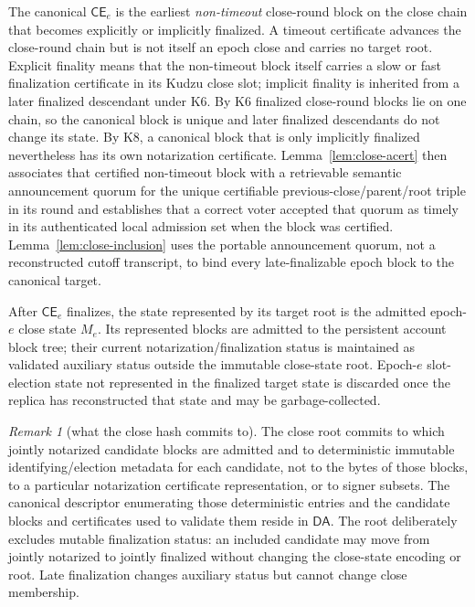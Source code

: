 \documentclass[11pt]{article}
\theoremstyle{definition}
\theoremstyle{remark}
\newtheorem{remark}[theorem]{Remark}
\newcommand{\CE}{\mathsf{CE}}
\newcommand{\DA}{\mathsf{DA}}
\begin{document}
The canonical $\CE_e$ is the earliest \emph{non-timeout} close-round block on the close chain that becomes explicitly or implicitly finalized. A timeout certificate advances the close-round chain but is not itself an epoch close and carries no target root. Explicit finality means that the non-timeout block itself carries a slow or fast finalization certificate in its Kudzu close slot; implicit finality is inherited from a later finalized descendant under K6. By K6 finalized close-round blocks lie on one chain, so the canonical block is unique and later finalized descendants do not change its state. By K8, a canonical block that is only implicitly finalized nevertheless has its own notarization certificate. Lemma~\ref{lem:close-acert} then associates that certified non-timeout block with a retrievable semantic announcement quorum for the unique certifiable previous-close/parent/root triple in its round and establishes that a correct voter accepted that quorum as timely in its authenticated local admission set when the block was certified. Lemma~\ref{lem:close-inclusion} uses the portable announcement quorum, not a reconstructed cutoff transcript, to bind every late-finalizable epoch block to the canonical target.

After $\CE_e$ finalizes, the state represented by its target root is the admitted epoch-$e$ close state $M_e$. Its represented blocks are admitted to the persistent account block tree; their current notarization/finalization status is maintained as validated auxiliary status outside the immutable close-state root. Epoch-$e$ slot-election state not represented in the finalized target state is discarded once the replica has reconstructed that state and may be garbage-collected.

\begin{remark}[what the close hash commits to]
The close root commits to which jointly notarized candidate blocks are admitted and to deterministic immutable identifying/election metadata for each candidate, not to the bytes of those blocks, to a particular notarization certificate representation, or to signer subsets. The canonical descriptor enumerating those deterministic entries and the candidate blocks and certificates used to validate them reside in $\DA$. The root deliberately excludes mutable finalization status: an included candidate may move from jointly notarized to jointly finalized without changing the close-state encoding or root. Late finalization changes auxiliary status but cannot change close membership.
\end{remark}
\end{document}
